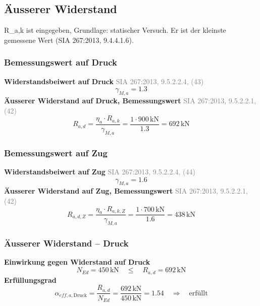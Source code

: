 \documentclass[11pt,a4paper]{article}
\newcommand{\normref}[1]{{\small\textcolor{gray}{#1}}}
\begin{document}
\subsection{Äusserer Widerstand}
R\_a,k ist eingegeben, Grundlage: statischer Versuch. Er ist der kleinste gemessene Wert (SIA 267:2013, 9.4.4.1.6).

\subsubsection{Bemessungswert auf Druck}
\noindent\textbf{Widerstandsbeiwert auf Druck} \hfill \normref{SIA 267:2013, 9.5.2.2.4, (43)}
\begin{equation*}
\gamma_{M,a} = 1.3
\end{equation*}
\noindent\textbf{Äusserer Widerstand auf Druck, Bemessungswert} \hfill \normref{SIA 267:2013, 9.5.2.2.1, (42)}
\begin{equation*}
R_{a,d} = \frac{\eta_a \cdot R_{a,k}}{\gamma_{M,a}} = \frac{1 \cdot 900\,\mathrm{kN}}{1.3} = 692\,\mathrm{kN}
\end{equation*}
\subsubsection{Bemessungswert auf Zug}
\noindent\textbf{Widerstandsbeiwert auf Zug} \hfill \normref{SIA 267:2013, 9.5.2.2.4, (44)}
\begin{equation*}
\gamma_{M,a} = 1.6
\end{equation*}
\noindent\textbf{Äusserer Widerstand auf Zug, Bemessungswert} \hfill \normref{SIA 267:2013, 9.5.2.2.1, (42)}
\begin{equation*}
R_{a,d,Z} = \frac{\eta_a \cdot R_{a,k,Z}}{\gamma_{M,a}} = \frac{1 \cdot 700\,\mathrm{kN}}{1.6} = 438\,\mathrm{kN}
\end{equation*}
\subsubsection{Äusserer Widerstand – Druck}
\noindent\textbf{Einwirkung gegen Widerstand auf Druck}
\begin{equation*}
N_{Ed} = 450\,\mathrm{kN} \quad \le \quad R_{a,d} = 692\,\mathrm{kN}
\end{equation*}
\noindent\textbf{Erfüllungsgrad}
\begin{equation*}
\alpha_{eff,a,\text{Druck}} = \frac{R_{a,d}}{N_{Ed}} = \frac{692\,\mathrm{kN}}{450\,\mathrm{kN}} = 1.54 \quad \Rightarrow \quad \text{erfüllt}
\end{equation*}
\end{document}
